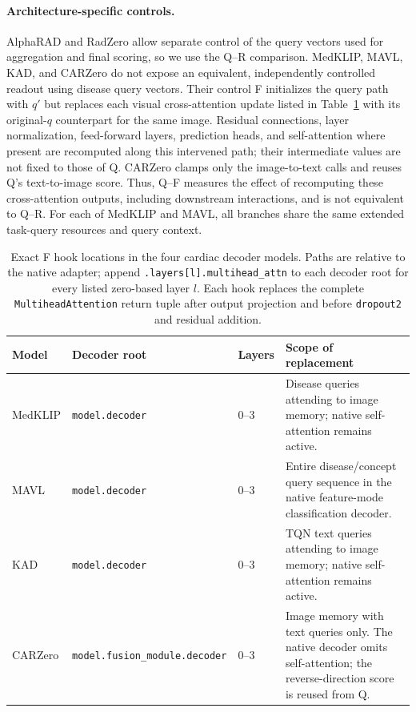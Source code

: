 \paragraph{Architecture-specific controls.}
AlphaRAD and RadZero allow separate control of the query vectors used for aggregation and final scoring, so we use the Q--R comparison. MedKLIP, MAVL, KAD, and CARZero do not expose an equivalent, independently controlled readout using disease query vectors. Their control F initializes the query path with $q'$ but replaces each visual cross-attention update listed in Table~\ref{tab:supp-f-hooks} with its original-$q$ counterpart for the same image. Residual connections, layer normalization, feed-forward layers, prediction heads, and self-attention where present are recomputed along this intervened path; their intermediate values are not fixed to those of Q. CARZero clamps only the image-to-text calls and reuses Q's text-to-image score. Thus, Q--F measures the effect of recomputing these cross-attention outputs, including downstream interactions, and is not equivalent to Q--R. For each of MedKLIP and MAVL, all branches share the same extended task-query resources and query context.

\begin{table}[t]
\centering
\small
\setlength{\tabcolsep}{5pt}
\begin{tabular}{@{}p{}p{}p{}p{}@{}}
\toprule
Model & Decoder root & Layers & Scope of replacement \\
\midrule
MedKLIP & \texttt{model.decoder} & 0--3 & Disease queries attending to image memory; native self-attention remains active. \\
MAVL & \texttt{model.decoder} & 0--3 & Entire disease/concept query sequence in the native feature-mode classification decoder. \\
KAD & \texttt{model.decoder} & 0--3 & TQN text queries attending to image memory; native self-attention remains active. \\
CARZero & \texttt{model.fusion\_module.}\newline\texttt{decoder} & 0--3 & Image memory with text queries only. The native decoder omits self-attention; the reverse-direction score is reused from Q. \\
\bottomrule
\end{tabular}
\caption{Exact F hook locations in the four cardiac decoder models. Paths are relative to the native adapter; append \texttt{.layers[l].multihead\_attn} to each decoder root for every listed zero-based layer $l$. Each hook replaces the complete \texttt{MultiheadAttention} return tuple after output projection and before \texttt{dropout2} and residual addition.}
\label{tab:supp-f-hooks}
\end{table}

